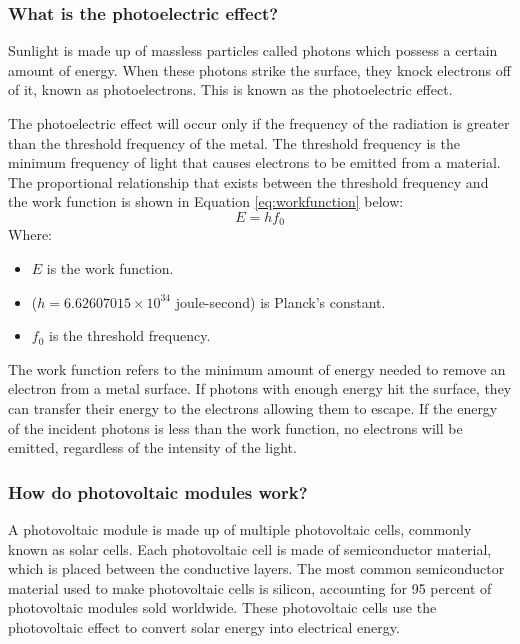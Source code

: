 \subsubsection{What is the photoelectric effect?}
Sunlight is made up of massless particles called photons which possess a certain amount of energy. When these photons strike the surface, they knock electrons off of it, known as photoelectrons. This is known as the photoelectric effect.\vspace{0.5em}

\noindent The photoelectric effect will occur only if the frequency of the radiation is greater than the threshold frequency of the metal. The threshold frequency is the minimum frequency of light that causes electrons to be emitted from a material. The proportional relationship that exists between the threshold frequency and the work function is shown in Equation \ref{eq:workfunction} below:
\begin{equation}
    E = hf_0
    \label{eq:workfunction}
\end{equation}
Where:
\begin{itemize}
    \item $E$ is the work function.
    \item ($h = 6.62607015 \times 10^{34}$ joule-second) is Planck's constant.
    \item $f_0$ is the threshold frequency. 
\end{itemize}\vspace{0.5em}
\noindent The work function refers to the minimum amount of energy needed to remove an electron from a metal surface. If photons with enough energy hit the surface, they can transfer their energy to the electrons allowing them to escape. If the energy of the incident photons is less than the work function, no electrons will be emitted, regardless of the intensity of the light.\vspace{0.5em}

\subsubsection{How do photovoltaic modules work?}
A photovoltaic module is made up of multiple photovoltaic cells, commonly known as solar cells. Each photovoltaic cell is made of semiconductor material, which is placed between the conductive layers. The most common semiconductor material used to make photovoltaic cells is silicon, accounting for 95 percent of photovoltaic modules sold worldwide. These photovoltaic cells use the photovoltaic effect to convert solar energy into electrical energy.\vspace{0.5em}

